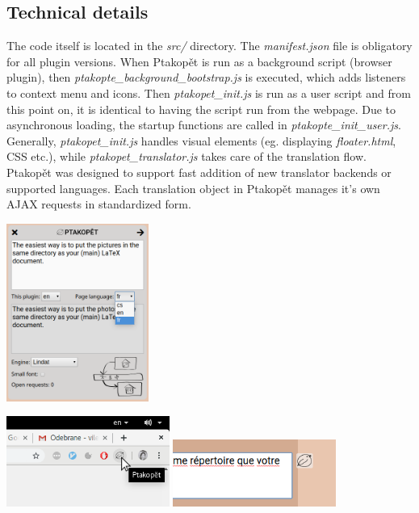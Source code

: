 \documentclass[a4paper]{article}
\begin{document}
\subsection*{Technical details}
The code itself is located in the \textit{src/} directory. The \textit{manifest.json} file is obligatory for all plugin versions. When Ptakopět is run as a background script (browser plugin), then \textit{ptakopte\_background\_bootstrap.js} is executed, which adds listeners to context menu and icons. Then \textit{ptakopet\_init.js} is run as a user script and from this point on, it is identical to having the script run from the webpage. Due to asynchronous loading, the startup functions are called in \textit{ptakopte\_init\_user.js}. Generally, \textit{ptakopet\_init.js} handles visual elements (eg. displaying \textit{floater.html}, CSS etc.), while \textit{ptakopet\_translator.js} takes care of the translation flow. Ptakopět was designed to support fast addition of new translator backends or supported languages. Each translation object in Ptakopět manages it's own AJAX requests in standardized form.

\vspace{1cm}
\begin{center}
\includegraphics[width=0.35\textwidth]{screenshot_4}
\end{center}
\begin{center}
\includegraphics[width=0.4\textwidth]{screenshot_5}
\includegraphics[width=0.4\textwidth]{screenshot_6}
\end{center}
\end{document}
